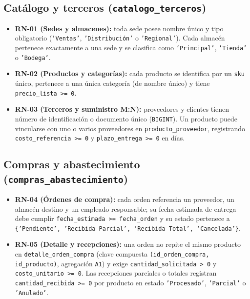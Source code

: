 \documentclass[11pt,oneside]{article}
\begin{document}
\subsection{Cat\'alogo y terceros (\texttt{catalogo\_terceros})}
\begin{itemize}[leftmargin=1.5em, itemsep=2.5pt]
  \item \textbf{RN-01 (Sedes y almacenes):} toda sede posee nombre \'unico y
        tipo obligatorio (\texttt{'Ventas'}, \texttt{'Distribuci\'on'} o
        \texttt{'Regional'}). Cada almac\'en pertenece exactamente a una sede y
        se clasifica como \texttt{'Principal'}, \texttt{'Tienda'} o
        \texttt{'Bodega'}.
  \item \textbf{RN-02 (Productos y categor\'ias):} cada producto se identifica
        por un \texttt{sku} \'unico, pertenece a una \'unica categor\'ia (de
        nombre \'unico) y tiene \texttt{precio\_lista >= 0}.
  \item \textbf{RN-03 (Terceros y suministro M:N):} proveedores y clientes
        tienen n\'umero de identificaci\'on o documento \'unico (\texttt{BIGINT}).
        Un producto puede vincularse con uno o varios proveedores en
        \texttt{producto\_proveedor}, registrando \texttt{costo\_referencia >= 0}
        y \texttt{plazo\_entrega >= 0} en d\'ias.
\end{itemize}

\subsection{Compras y abastecimiento (\texttt{compras\_abastecimiento})}
\begin{itemize}[leftmargin=1.5em, itemsep=2.5pt]
  \item \textbf{RN-04 (\'Ordenes de compra):} cada orden referencia un
        proveedor, un almac\'en destino y un empleado responsable; su fecha
        estimada de entrega debe cumplir \texttt{fecha\_estimada >= fecha\_orden}
        y su estado pertenece a \texttt{\{'Pendiente', 'Recibida Parcial',
        'Recibida Total', 'Cancelada'\}}.
  \item \textbf{RN-05 (Detalle y recepciones):} una orden no repite el mismo
        producto en \texttt{detalle\_orden\_compra} (clave compuesta
        \texttt{(id\_orden\_compra, id\_producto)}, agregaci\'on \texttt{A1}) y
        exige \texttt{cantidad\_solicitada > 0} y \texttt{costo\_unitario >= 0}.
        Las recepciones parciales o totales registran \texttt{cantidad\_recibida >= 0}
        por producto en estado \texttt{'Procesado'}, \texttt{'Parcial'} o
        \texttt{'Anulado'}.
\end{itemize}
\end{document}
